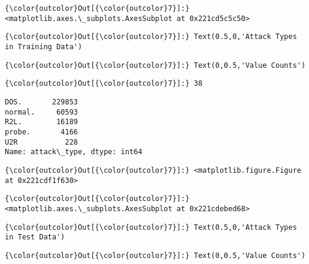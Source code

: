 \documentclass[11pt]{article}
\begin{document}
\begin{Verbatim}[commandchars=\\\{\}]
{\color{outcolor}Out[{\color{outcolor}7}]:} <matplotlib.axes.\_subplots.AxesSubplot at 0x221cd5c5c50>
\end{Verbatim}
            
\begin{Verbatim}[commandchars=\\\{\}]
{\color{outcolor}Out[{\color{outcolor}7}]:} Text(0.5,0,'Attack Types in Training Data')
\end{Verbatim}
            
\begin{Verbatim}[commandchars=\\\{\}]
{\color{outcolor}Out[{\color{outcolor}7}]:} Text(0,0.5,'Value Counts')
\end{Verbatim}
            
\begin{Verbatim}[commandchars=\\\{\}]
{\color{outcolor}Out[{\color{outcolor}7}]:} 38
\end{Verbatim}
            
    \begin{Verbatim}[commandchars=\\\{\}]
DOS.       229853
normal.     60593
R2L.        16189
probe.       4166
U2R           228
Name: attack\_type, dtype: int64

    \end{Verbatim}

\begin{Verbatim}[commandchars=\\\{\}]
{\color{outcolor}Out[{\color{outcolor}7}]:} <matplotlib.figure.Figure at 0x221cdf1f630>
\end{Verbatim}
            
\begin{Verbatim}[commandchars=\\\{\}]
{\color{outcolor}Out[{\color{outcolor}7}]:} <matplotlib.axes.\_subplots.AxesSubplot at 0x221cdebed68>
\end{Verbatim}
            
\begin{Verbatim}[commandchars=\\\{\}]
{\color{outcolor}Out[{\color{outcolor}7}]:} Text(0.5,0,'Attack Types in Test Data')
\end{Verbatim}
            
\begin{Verbatim}[commandchars=\\\{\}]
{\color{outcolor}Out[{\color{outcolor}7}]:} Text(0,0.5,'Value Counts')
\end{Verbatim}
            
\end{document}
